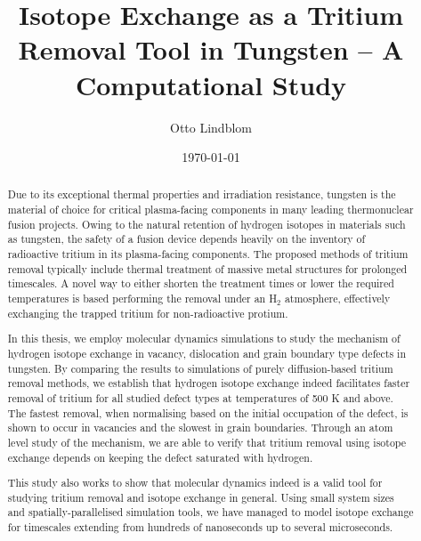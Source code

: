 \documentclass[english,twoside,openright]{HYgradu}
\title{Isotope Exchange as a Tritium Removal Tool in Tungsten -- A Computational Study}
\author{Otto Lindblom}
\date{\today}
\begin{document}
\maketitle


\begin{abstract}
Due to its exceptional thermal properties and irradiation resistance, tungsten is the material of choice for critical plasma-facing components in many leading thermonuclear fusion projects.
Owing to the natural retention of hydrogen isotopes in materials such as tungsten, the safety of a fusion device depends heavily on the inventory of radioactive tritium in its plasma-facing components. 
The proposed methods of tritium removal typically include thermal treatment of massive metal structures for prolonged timescales.
A novel way to either shorten the treatment times or lower the required temperatures is based performing the removal under an H$_2$ atmosphere, effectively exchanging the trapped tritium for non-radioactive protium. 

In this thesis, we employ molecular dynamics simulations to study the mechanism of hydrogen isotope exchange in vacancy, dislocation and grain boundary type defects in tungsten.
By comparing the results to simulations of purely diffusion-based tritium removal methods, we establish that hydrogen isotope exchange indeed facilitates faster removal of tritium for all studied defect types at temperatures of 500 K and above.
The fastest removal, when normalising based on the initial occupation of the defect, is shown to occur in vacancies and the slowest in grain boundaries.   
Through an atom level study of the mechanism, we are able to verify that tritium removal using isotope exchange depends on keeping the defect saturated with hydrogen.

This study also works to show that molecular dynamics indeed is a valid tool for studying tritium removal and isotope exchange in general. 
Using small system sizes and spatially-parallelised simulation tools, we have managed to model isotope exchange for timescales extending from hundreds of nanoseconds up to several microseconds.
\end{abstract}
\end{document}
